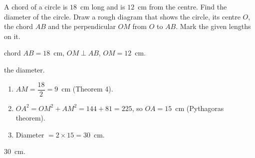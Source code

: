 \ques A chord of a circle is $18$~cm long and is $12$~cm from the centre. Find the diameter of the circle. Draw a rough diagram that shows the circle, its centre $O$, the chord $AB$ and the perpendicular $OM$ from $O$ to $AB$. Mark the given lengths on it. 
\begin{answerblock}
\begin{minipage}[t]{0.66\linewidth}\vspace{0pt}
\Given chord $AB=18$~cm, $OM\perp AB$, $OM=12$~cm.

\Tofind the diameter.

\begin{enumerate}[label=\arabic*.,leftmargin=1.6em,itemsep=0pt,topsep=2pt]
\item $AM=\dfrac{18}{2}=9$~cm (Theorem 4).
\item $OA^2=OM^2+AM^2=144+81=225$, so $OA=15$~cm (Pythagoras theorem).
\item Diameter $=2\times15=30$~cm.
\end{enumerate}
\Ans $30$~cm.
\end{minipage}\hfill
\begin{minipage}[t]{0.3\linewidth}\vspace{0pt}
\centering
{}
\end{minipage}
\end{answerblock}
